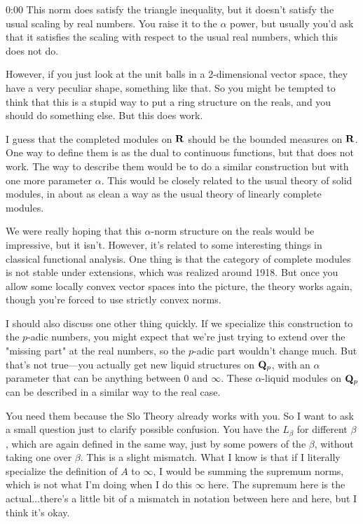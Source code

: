 \begin{unfinished}{0:00}
This norm does satisfy the triangle inequality, but it doesn't satisfy the usual scaling by real numbers. You raise it to the $\alpha$ power, but usually you'd ask that it satisfies the scaling with respect to the usual real numbers, which this does not do.

However, if you just look at the unit balls in a 2-dimensional vector space, they have a very peculiar shape, something like that. So you might be tempted to think that this is a stupid way to put a ring structure on the reals, and you should do something else. But this does work.

I guess that the completed modules on $\mathbf R$ should be the bounded measures on $\mathbf R$. One way to define them is as the dual to continuous functions, but that does not work. The way to describe them would be to do a similar construction but with one more parameter $\alpha$. This would be closely related to the usual theory of solid modules, in about as clean a way as the usual theory of linearly complete modules.

We were really hoping that this $\alpha$-norm structure on the reals would be impressive, but it isn't. However, it's related to some interesting things in classical functional analysis. One thing is that the category of complete modules is not stable under extensions, which was realized around 1918. But once you allow some locally convex vector spaces into the picture, the theory works again, though you're forced to use strictly convex norms.

I should also discuss one other thing quickly. If we specialize this construction to the $p$-adic numbers, you might expect that we're just trying to extend over the "missing part" at the real numbers, so the $p$-adic part wouldn't change much. But that's not true---you actually get new liquid structures on $\mathbf Q_p$, with an $\alpha$ parameter that can be anything between 0 and $\infty$. These $\alpha$-liquid modules on $\mathbf Q_p$ can be described in a similar way to the real case.

You need them because the Slo Theory already works with you. So I want to ask a small question just to clarify possible confusion. You have the $L_\beta$ for different $\beta$, which are again defined in the same way, just by some powers of the $\beta$, without taking one over $\beta$. This is a slight mismatch. What I know is that if I literally specialize the definition of $A$ to $\infty$, I would be summing the supremum norms, which is not what I'm doing when I do this $\infty$ here. The supremum here is the actual...there's a little bit of a mismatch in notation between here and here, but I think it's okay.


\end{unfinished}
